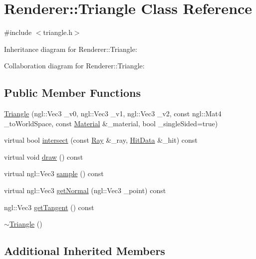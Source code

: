 \hypertarget{classRenderer_1_1Triangle}{}\section{Renderer\+:\+:Triangle Class Reference}
\label{classRenderer_1_1Triangle}


{\ttfamily \#include $<$triangle.\+h$>$}



Inheritance diagram for Renderer\+:\+:Triangle\+:


Collaboration diagram for Renderer\+:\+:Triangle\+:
\subsection*{Public Member Functions}
\begin{DoxyCompactItemize}
\item 
\hyperlink{classRenderer_1_1Triangle_a7053d2e8592075bc7a1c9bbdbf95ffdc}{Triangle} (ngl\+::\+Vec3 \+\_\+v0, ngl\+::\+Vec3 \+\_\+v1, ngl\+::\+Vec3 \+\_\+v2, const ngl\+::\+Mat4 \+\_\+to\+World\+Space, const \hyperlink{structMaterial}{Material} \&\+\_\+material, bool \+\_\+single\+Sided=true)
\item 
virtual bool \hyperlink{classRenderer_1_1Triangle_af9802d9321c1fcdeb3aae9364efd246c}{intersect} (const \hyperlink{structRenderer_1_1Ray}{Ray} \&\+\_\+ray, \hyperlink{structRenderer_1_1HitData}{Hit\+Data} \&\+\_\+hit) const 
\item 
virtual void \hyperlink{classRenderer_1_1Triangle_a325a404a8c7b9bef234738dcb1caa19b}{draw} () const 
\item 
virtual ngl\+::\+Vec3 \hyperlink{classRenderer_1_1Triangle_a40b6162167de14c18f0ec9233eb7e2ad}{sample} () const 
\item 
virtual ngl\+::\+Vec3 \hyperlink{classRenderer_1_1Triangle_adae4e94dc4c3b4e4ed844a222815f0a4}{get\+Normal} (ngl\+::\+Vec3 \+\_\+point) const 
\item 
ngl\+::\+Vec3 \hyperlink{classRenderer_1_1Triangle_a36f812846c8e2fcf5ced411f3e12812b}{get\+Tangent} () const 
\item 
\hyperlink{classRenderer_1_1Triangle_aa4d8804ea95f8d0a64681fd6eae0bd6c}{$\sim$\+Triangle} ()
\end{DoxyCompactItemize}
\subsection*{Additional Inherited Members}


